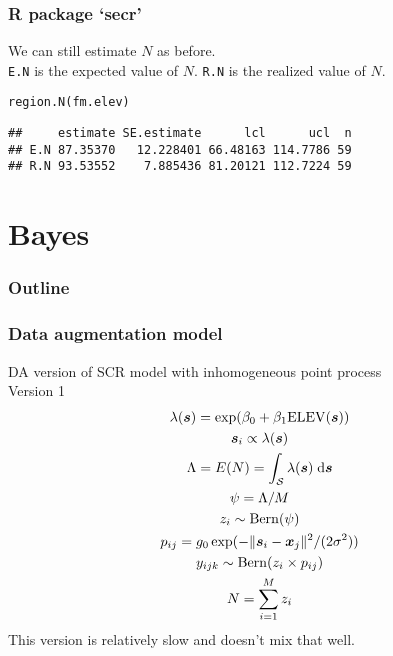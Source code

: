 \documentclass[color=usenames,dvipsnames]{beamer}\usepackage[]{graphicx}\usepackage[]{color}
\makeatletter
\newcommand{\hlstd}[1]{\textcolor[rgb]{0,0,0}{#1}}%
\newcommand{\hlkwd}[1]{\textcolor[rgb]{0.004,0.004,0.506}{#1}}%
\newenvironment{kframe}{%
 \def\at@end@of@kframe{}%
 \ifinner\ifhmode%
  \def\at@end@of@kframe{\end{minipage}}%
  \begin{minipage}{\columnwidth}%
 \fi\fi%
 \def\FrameCommand##1{\hskip\@totalleftmargin \hskip-\fboxsep
 \colorbox{shadecolor}{##1}\hskip-\fboxsep
     \hskip-\linewidth \hskip-\@totalleftmargin \hskip\columnwidth}%
 \MakeFramed {\advance\hsize-\width
   \@totalleftmargin\z@ \linewidth\hsize
   \@setminipage}}%
 {\par\unskip\endMakeFramed%
 \at@end@of@kframe}
\newenvironment{knitrout}{}{} %
\newcommand{\inr}[1]{\colorbox{inlinecolor}{\texttt{#1}}}
\makeatother
\begin{document}
\begin{frame}[fragile]
  \frametitle{R package `secr'}
  We can still estimate $N$ as before. \\
  \vfill
  \inr{E.N} is the expected value of
  $N$. \inr{R.N} is the realized value of $N$. 
  \vfill
\begin{knitrout}\small
{}\color{fgcolor}\begin{kframe}
\begin{alltt}
\hlkwd{region.N}\hlstd{(fm.elev)}
\end{alltt}
\begin{verbatim}
##     estimate SE.estimate      lcl      ucl  n
## E.N 87.35370   12.228401 66.48163 114.7786 59
## R.N 93.53552    7.885436 81.20121 112.7224 59
\end{verbatim}
\end{kframe}
\end{knitrout}
\end{frame}




\section{Bayes}




\begin{frame}
  \frametitle{Outline}
  \Large
  \tableofcontents[currentsection]
\end{frame}





\begin{frame}
  \frametitle{Data augmentation model}
  DA version of SCR model with inhomogeneous point process \\
  \centering
  Version 1 \\
  \begin{gather*}
    \lambda({\bm s}) = \exp(\beta_0 + \beta_1 \mathrm{ELEV}({\bm s})) \\
    {\bm s}_i \propto \lambda({\bm s}) \\
    \Lambda = E(N) = \int_{\mathcal{S}} \lambda({\bm s})\; \mathrm{d}{\bm s} \\
    \psi = \Lambda/M \\
    z_i \sim \mathrm{Bern}(\psi) \\
    p_{ij} = g_0\exp(-\|{\bm s}_i-{\bm x}_j\|^2/(2\sigma^2)) \\
    y_{ijk} \sim \mathrm{Bern}(z_i\times p_{ij}) \\
    N=\sum_{i=1}^M z_i
  \end{gather*}
  \pause \vfill
  This version is relatively slow and doesn't mix that well. \\
\end{frame}
\end{document}
